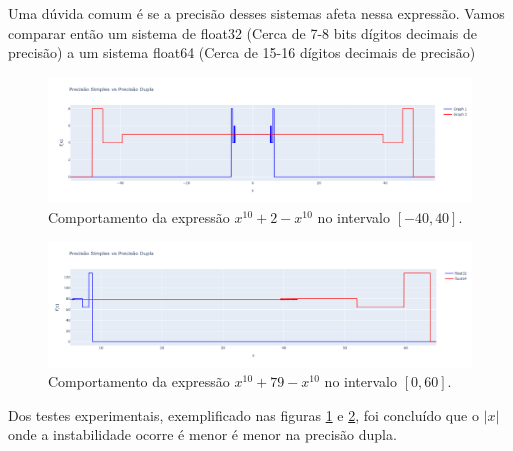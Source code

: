 Uma dúvida comum é se a precisão desses sistemas afeta nessa expressão. Vamos comparar então um sistema de float32 (Cerca de 7-8 bits dígitos decimais de precisão) a um sistema float64
(Cerca de 15-16  dígitos decimais de precisão)
\begin{figure}[h]
    \centering 
    \includegraphics[width=1\textwidth]{Imagens/32x64_full.png}
    \caption{Comportamento da expressão \(x^{10} + 2 - x^{10}\) no intervalo \([-40, 40]\).}
    \label{fig:32x64_full}
\end{figure}
\begin{figure}[H]
    \centering 
    \includegraphics[width=1\textwidth]{Imagens/32x64.png}
    \caption{Comportamento da expressão \(x^{10} + 79 - x^{10}\) no intervalo \([0, 60]\).}
    \label{fig:32x64}
\end{figure}
Dos testes experimentais, exemplificado nas figuras \ref{fig:32x64_full} e \ref{fig:32x64}, foi concluído que o $|x|$ onde a instabilidade ocorre é menor é menor na precisão dupla.


